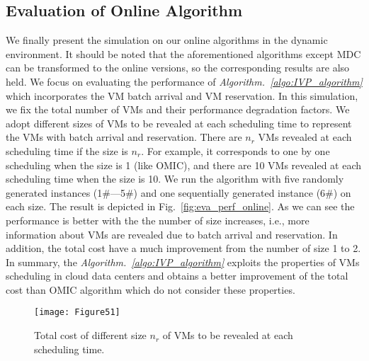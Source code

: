 \documentclass[10pt,journal]{IEEEtran}
\begin{document}
\subsection{Evaluation of Online Algorithm}
We finally present the simulation on our online algorithms in the dynamic environment. It should be noted that the aforementioned algorithms except MDC can be transformed to the online versions, so the corresponding results are also held. We focus on evaluating the performance of \textit{Algorithm.~\ref{algo:IVP_algorithm}} which incorporates the VM batch arrival and VM reservation. In this simulation, we fix the total number of VMs and their performance degradation factors. We adopt different sizes of VMs to be revealed at each scheduling time to represent the VMs with batch arrival and reservation. There are $n_r$ VMs revealed at each scheduling time if the size is $n_r$. For example, it corresponds to one by one scheduling when the size is 1 (like OMIC), and there are 10 VMs revealed at each scheduling time when the size is 10. We run the algorithm with five randomly generated instances (1\#---5\#) and one sequentially generated instance (6\#) on each size. The result is depicted in Fig.~\ref{fig:eva_perf_online}. As we can see the performance is better with the the number of size increases, i.e., more information about VMs are revealed due to batch arrival and reservation. In addition, the total cost have a much improvement from the number of size 1 to 2. In summary, the \textit{Algorithm.~\ref{algo:IVP_algorithm}} exploits the properties of VMs scheduling in cloud data centers and obtains a better improvement of the total cost than OMIC algorithm which do not consider these properties.
\begin{figure}[htbp]
\centering
\texttt{[image: Figure51]}
\centering
\caption{\label{fig:eva_perf_online}Total cost of different size $n_r$ of VMs to be revealed at each scheduling time.}\label{fig:graph}
\end{figure}
\end{document}
